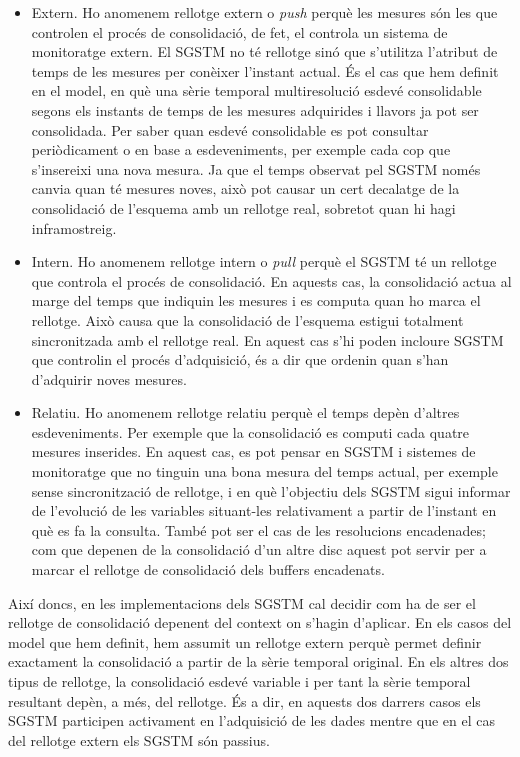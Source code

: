 \begin{itemize}
\item Extern. Ho anomenem rellotge extern o \emph{push} perquè les
  mesures són les que controlen el procés de consolidació, de fet, el
  controla un sistema de monitoratge extern.  El \gls{SGSTM} no té
  rellotge sinó que s'utilitza l'atribut de temps de les mesures per
  conèixer l'instant actual.  És el cas que hem definit en el model,
  en què una sèrie temporal multiresolució esdevé consolidable segons
  els instants de temps de les mesures adquirides i llavors ja pot ser
  consolidada. Per saber quan esdevé consolidable es pot consultar
  periòdicament o en base a esdeveniments, per exemple cada cop que
  s'insereixi una nova mesura.  Ja que el temps observat pel
  \gls{SGSTM} només canvia quan té mesures noves, això pot causar un
  cert decalatge de la consolidació de l'esquema amb un rellotge real,
  sobretot quan hi hagi inframostreig. 

\item Intern. Ho anomenem rellotge intern o \emph{pull} perquè el
  \gls{SGSTM} té un rellotge que controla el procés de consolidació.
  En aquests cas, la consolidació actua al marge del temps que
  indiquin les mesures i es computa quan ho marca el rellotge.  Això
  causa que la consolidació de l'esquema estigui totalment
  sincronitzada amb el rellotge real. En aquest cas s'hi poden
  incloure \gls{SGSTM} que controlin el procés d'adquisició, és a dir
  que ordenin quan s'han d'adquirir noves mesures. 


\item Relatiu.  Ho anomenem rellotge relatiu perquè el temps depèn
  d'altres esdeveniments. Per exemple que la consolidació es computi
  cada quatre mesures inserides. En aquest cas, es pot pensar en
  \gls{SGSTM} i sistemes de monitoratge que no tinguin una bona mesura
  del temps actual, per exemple sense sincronització de rellotge, i en
  què l'objectiu dels \gls{SGSTM} sigui informar de l'evolució de les
  variables situant-les relativament a partir de l'instant en què es
  fa la consulta. També pot ser el cas de les resolucions encadenades;
  com que depenen de la consolidació d'un altre disc aquest pot servir
  per a marcar el rellotge de consolidació dels buffers encadenats.




\end{itemize}


Així doncs, en les implementacions dels \gls{SGSTM} cal decidir com ha
de ser el rellotge de consolidació depenent del context on s'hagin
d'aplicar. En els casos del model que hem definit, hem assumit un
rellotge extern perquè permet definir exactament la consolidació a
partir de la sèrie temporal original. En els altres dos tipus de
rellotge, la consolidació esdevé variable i per tant la sèrie temporal
resultant depèn, a més, del rellotge. És a dir, en aquests dos darrers
casos els \gls{SGSTM} participen activament en l'adquisició de les
dades mentre que en el cas del rellotge extern els \gls{SGSTM} són
passius.




